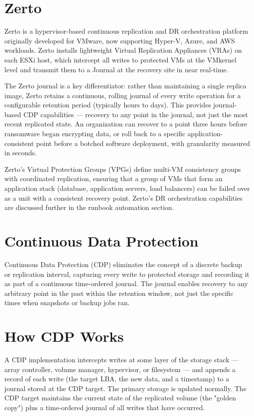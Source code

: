 \section{Zerto}
Zerto is a hypervisor-based continuous replication and DR orchestration platform originally developed for VMware, now supporting Hyper-V, Azure, and AWS workloads. Zerto installs lightweight Virtual Replication Appliances (VRAs) on each ESXi host, which intercept all writes to protected VMs at the VMkernel level and transmit them to a Journal at the recovery site in near real-time.

The Zerto journal is a key differentiator: rather than maintaining a single replica image, Zerto retains a continuous, rolling journal of every write operation for a configurable retention period (typically hours to days). This provides journal-based CDP capabilities --- recovery to any point in the journal, not just the most recent replicated state. An organization can recover to a point three hours before ransomware began encrypting data, or roll back to a specific application-consistent point before a botched software deployment, with granularity measured in seconds.

Zerto's Virtual Protection Groups (VPGs) define multi-VM consistency groups with coordinated replication, ensuring that a group of VMs that form an application stack (database, application servers, load balancers) can be failed over as a unit with a consistent recovery point. Zerto's DR orchestration capabilities are discussed further in the runbook automation section.

\section{Continuous Data Protection}
Continuous Data Protection (CDP) eliminates the concept of a discrete backup or replication interval, capturing every write to protected storage and recording it as part of a continuous time-ordered journal. The journal enables recovery to any arbitrary point in the past within the retention window, not just the specific times when snapshots or backup jobs ran.

\section{How CDP Works}
A CDP implementation intercepts writes at some layer of the storage stack --- array controller, volume manager, hypervisor, or filesystem --- and appends a record of each write (the target LBA, the new data, and a timestamp) to a journal stored at the CDP target. The primary storage is updated normally. The CDP target maintains the current state of the replicated volume (the "golden copy") plus a time-ordered journal of all writes that have occurred.

